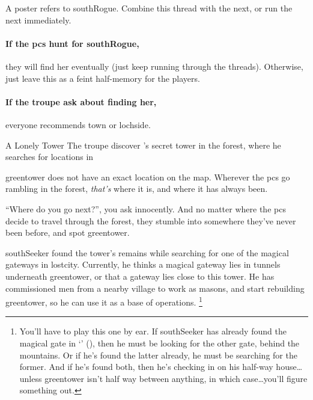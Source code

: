 A poster refers to \gls{southRogue}.
Combine this \gls{thread} with the next, or run the next immediately.

\paragraph{If the \glspl{pc} hunt for \gls{southRogue},}
they will find her eventually (just keep running through the \glspl{thread}).
Otherwise, just leave this as a feint half-memory for the players.

\paragraph{If the troupe ask about finding her,}
everyone recommends \gls{town} or \gls{lochside}.

{A Lonely Tower}%
{The troupe discover 's secret tower in the forest, where he searches for locations in }%

\label{green_tower_sq}

\Gls{greentower} does not have an exact location on the map.
Wherever the \glspl{pc} go \gls{rambling} in the forest, \textit{that's} where it is, and where it has always been.

``Where do you go next?'', you ask innocently.
And no matter where the \glspl{pc} decide to travel through the forest, they stumble into somewhere they've never been before, and spot \gls{greentower}.

\begin{exampletext}
  \Gls{southSeeker} found the tower's remains while searching for one of the magical gateways in \gls{lostcity}.
  Currently, he thinks a magical gateway lies in tunnels underneath \gls{greentower}, or that a gateway lies close to this tower.
  He has commissioned men from a nearby \gls{village} to work as masons, and start rebuilding \gls{greentower}, so he can use it as a base of operations.%
  \footnote{You'll have to play this one by ear.
  If \gls{southSeeker} has already found the magical gate in `' (), then he must be looking for the other gate, behind the mountains.
  Or if he's found the latter already, he must be searching for the former.
  And if he's found both, then he's checking in on his half-way house\ldots unless \gls{greentower} isn't half way between anything, in which case\ldots you'll figure something out.}
\end{exampletext}

